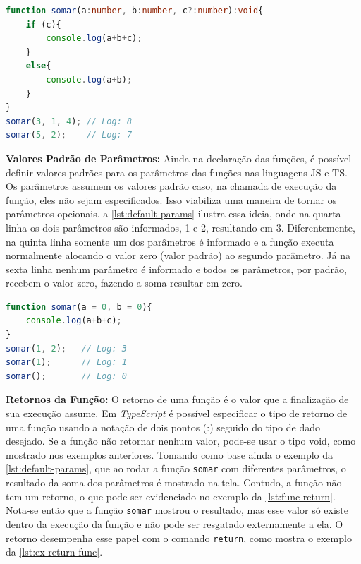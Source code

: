 \begin{lstlisting}[language=TypeScript, caption=Exemplos de Parâmetros Opcionais em TS., label=lst:opt-param]
function somar(a:number, b:number, c?:number):void{
    if (c){
        console.log(a+b+c);
    }
    else{
        console.log(a+b);
    }
}
somar(3, 1, 4); // Log: 8
somar(5, 2);    // Log: 7
\end{lstlisting}

\textbf{Valores Padrão de Parâmetros:} Ainda na declaração das funções, é possível definir valores padrões para os parâmetros das funções nas linguagens JS e TS. Os parâmetros assumem os valores padrão caso, na chamada de execução da função, eles não sejam especificados. Isso viabiliza uma maneira de tornar os parâmetros opcionais. a \autoref{lst:default-params} ilustra essa ideia, onde na quarta linha os dois parâmetros são informados, 1 e 2, resultando em 3. Diferentemente, na quinta linha somente um dos parâmetros é informado e a função executa normalmente alocando o valor zero (valor padrão) ao segundo parâmetro. Já na sexta linha nenhum parâmetro é informado e todos os parâmetros, por padrão, recebem o valor zero, fazendo a soma resultar em zero.

\Needspace{0.3\textheight}
\begin{lstlisting}[language=TypeScript, caption=Exemplos de Valores Padrão de Parâmetros em JS., label=lst:default-params]
function somar(a = 0, b = 0){
    console.log(a+b+c);
}
somar(1, 2);   // Log: 3
somar(1);      // Log: 1
somar();       // Log: 0
\end{lstlisting}

\textbf{Retornos da Função:} O retorno de uma função é o valor que a finalização de sua execução assume. Em \textit{TypeScript} é possível especificar o tipo de retorno de uma função usando a notação de dois pontos (:) seguido do tipo de dado desejado. Se a função não retornar nenhum valor, pode-se usar o tipo void, como mostrado nos exemplos anteriores. Tomando como base ainda o exemplo da \autoref{lst:default-params}, que ao rodar a função \texttt{somar} com diferentes parâmetros, o resultado da soma dos parâmetros é mostrado na tela. Contudo, a função não tem um retorno, o que pode ser evidenciado no exemplo da \autoref{lst:func-return}. Nota-se então que a função \texttt{somar} mostrou o resultado, mas esse valor só existe dentro da execução da função e não pode ser resgatado externamente a ela. O retorno desempenha esse papel com o comando \texttt{return}, como mostra o exemplo da \autoref{lst:ex-return-func}.

